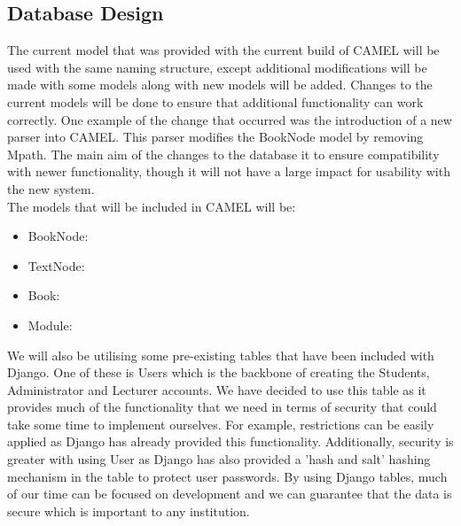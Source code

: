 \subsection{Database Design}
	The current model that was provided with the current build of CAMEL will be used with the same naming structure, except additional modifications will be made with some models along with new models will be added. Changes to the current models will be done to ensure that additional functionality can work correctly. One example of the change that occurred was the introduction of a new parser into CAMEL. This parser modifies the BookNode model by removing Mpath. The main aim of the changes to the database it to ensure compatibility with newer functionality, though it will not have a large impact for usability with the new system.\\
	
	The models that will be included in CAMEL will be:
	\begin{itemize}
		\item BookNode:
		\item TextNode:
		\item Book:
		\item Module:
	\end{itemize}
	
	We will also be utilising some pre-existing tables that have been included with Django. One of these is Users which is the backbone of creating the Students, Administrator and Lecturer accounts. We have decided to use this table as it provides much of the functionality that we need in terms of security that could take some time to implement ourselves. For example, restrictions can be easily applied as Django has already provided this functionality. Additionally, security is greater with using User as Django has also provided a 'hash and salt' hashing mechanism in the table to protect user passwords. By using Django tables, much of our time can be focused on development and we can guarantee that the data is secure which is important to any institution.\\
	